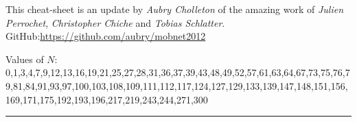 \documentclass[6pt]{scrartcl}
\begin{document}
\begin{multicols}{4}

\begin{center}
This cheat-sheet is an update by \emph{Aubry Cholleton} of the amazing work of \emph{Julien Perrochet}, \emph{Christopher Chiche} and \emph{Tobias Schlatter}. GitHub:\url{https://github.com/aubry/mobnet2012}
\end{center}
\end{multicols}

\begin{center}
\vspace{-10pt}
Values of $N$: 0,1,3,4,7,9,12,13,16,19,21,25,27,28,31,36,37,39,43,48,49,52,57,61,63,64,67,73,75,76,79,81,84,91,93,97,100,103,108,109,111,112,117,124,127,129,133,139,147,148,151,156,169,171,175,192,193,196,217,219,243,244,271,300



\end{center}
\vspace{-5pt}
\hrule
\vspace{-10pt}

\end{document}
